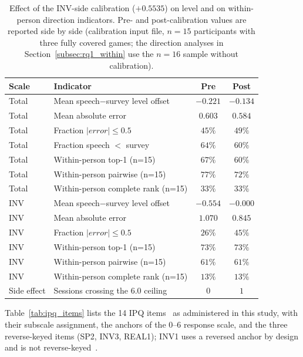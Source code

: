 \begin{table}[htbp]
\centering
\caption{Effect of the INV-side calibration ($+0.5535$) on level and on within-person direction indicators. Pre- and post-calibration values are reported side by side (calibration input file, $n=15$ participants with three fully covered games; the direction analyses in Section~\ref{subsec:rq1_within} use the $n=16$ sample without calibration).}
\label{tab:calibration_prepost}
\small
\begin{tabular}{llcc}
\hline
Scale & Indicator & Pre & Post \\
\hline
Total & Mean speech$-$survey level offset & $-0.221$ & $-0.134$ \\
Total & Mean absolute error & $0.603$ & $0.584$ \\
Total & Fraction $|error|\le 0.5$ & $45\%$ & $49\%$ \\
Total & Fraction speech $<$ survey & $64\%$ & $60\%$ \\
Total & Within-person top-1 (n=15) & $67\%$ & $60\%$ \\
Total & Within-person pairwise (n=15) & $77\%$ & $72\%$ \\
Total & Within-person complete rank (n=15) & $33\%$ & $33\%$ \\
INV & Mean speech$-$survey level offset & $-0.554$ & $-0.000$ \\
INV & Mean absolute error & $1.070$ & $0.845$ \\
INV & Fraction $|error|\le 0.5$ & $26\%$ & $45\%$ \\
INV & Within-person top-1 (n=15) & $73\%$ & $73\%$ \\
INV & Within-person pairwise (n=15) & $61\%$ & $61\%$ \\
INV & Within-person complete rank (n=15) & $13\%$ & $13\%$ \\
Side effect & Sessions crossing the $6.0$ ceiling & $0$ & $1$ \\
\hline
\end{tabular}
\end{table}

Table~\ref{tab:ipq_items} lists the 14 IPQ items~\cite{schubert2001experience} as administered in this study, with their subscale assignment, the anchors of the 0--6 response scale, and the three reverse-keyed items (SP2, INV3, REAL1); INV1 uses a reversed anchor by design and is not reverse-keyed~\cite{tran2024ipq}.


